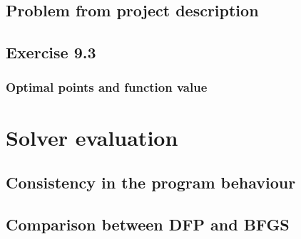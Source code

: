 \documentclass{article}
\begin{document}
\subsection{Problem from project description}

\subsection{Exercise 9.3}


\subsubsection{Optimal points and function value}


\section{Solver evaluation}
\subsection{Consistency in the program behaviour}

\subsection{Comparison between DFP and BFGS}





%
%
%
%
%
%
%
\end{document}
